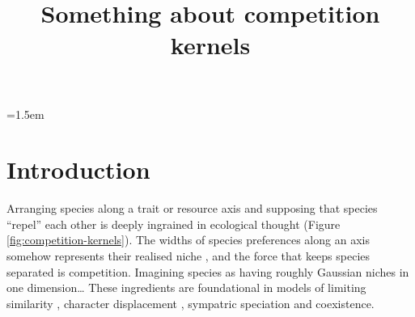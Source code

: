 \documentclass[a4paper,11pt]{article}
\title{Something about competition kernels}
\author{}
\date{}
\affiliation{}
\begin{document}

\parindent=1.5em
\addtolength{\parskip}{.3em}


\section{Introduction}

%
%
Arranging species along a trait or resource axis and supposing that
species ``repel'' each other is deeply ingrained in ecological thought
(Figure \ref{fig:competition-kernels}).
%
The widths of species preferences along an axis somehow represents
their realised niche \citep[\textit{sensu}][]{Hutchinson-1957}, and
the force that keeps species separated is competition.
Imagining species as having roughly Gaussian niches in one dimension\ldots
These ingredients are foundational in models of limiting similarity
\citep{MacArthur-1967}, character displacement \citep{Taper-1985,
  Case-2000, Goldberg-2006}, sympatric speciation
\citep{Dieckmann-1999} and coexistence.
\end{document}
